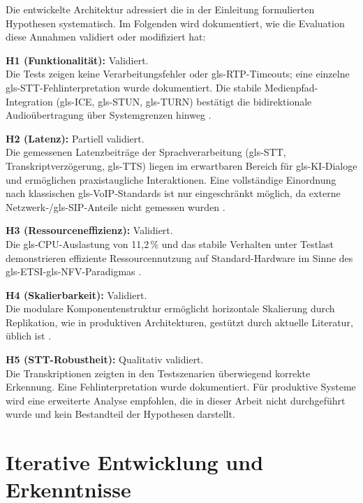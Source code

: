 Die entwickelte Architektur adressiert die in der Einleitung formulierten Hypothesen systematisch. Im Folgenden wird dokumentiert, wie die Evaluation diese Annahmen validiert oder modifiziert hat:

\textbf{H1 (Funktionalität):} Validiert.\\ Die Tests zeigen keine Verarbeitungsfehler oder \gls{gls-RTP}-Timeouts; eine einzelne \gls{gls-STT}-Fehlinterpretation wurde dokumentiert. Die stabile Medienpfad-Integration (\gls{gls-ICE}, \gls{gls-STUN}, \gls{gls-TURN}) bestätigt die bidirektionale Audioübertragung über Systemgrenzen hinweg \parencite{rfc5245,rfc5389,rfc5766,rfc3711}.

\textbf{H2 (Latenz):} Partiell validiert.\\ Die gemessenen Latenzbeiträge der Sprachverarbeitung (\gls{gls-STT}, Transkriptverzögerung, \gls{gls-TTS}) liegen im erwartbaren Bereich für \gls{gls-KI}‑Dialoge und ermöglichen praxistaugliche Interaktionen. Eine vollständige Einordnung nach klassischen \gls{gls-VoIP}‑Standards ist nur eingeschränkt möglich, da externe Netzwerk‑/\gls{gls-SIP}‑Anteile nicht gemessen wurden \parencite{ITU-T-G114}.

\textbf{H3 (Ressourceneffizienz):} Validiert.\\ Die \gls{gls-CPU}-Auslastung von 11,2\,\% und das stabile Verhalten unter Testlast demonstrieren effiziente Ressourcennutzung auf Standard-Hardware im Sinne des \gls{gls-ETSI}-\gls{gls-NFV}-Paradigmas \parencite{ETSI-NFV,ETSI-REL}.

\textbf{H4 (Skalierbarkeit):} Validiert.\\ Die modulare Komponentenstruktur ermöglicht horizontale Skalierung durch Replikation, wie in produktiven Architekturen, gestützt durch aktuelle Literatur, üblich ist \parencite{ETSI-REL,Antonova2025}.

\textbf{H5 (STT-Robustheit):} Qualitativ validiert.\\ Die Transkriptionen zeigten in den Testszenarien überwiegend korrekte Erkennung. Eine Fehlinterpretation wurde dokumentiert. Für produktive Systeme wird eine erweiterte Analyse empfohlen, die in dieser Arbeit nicht durchgeführt wurde und kein Bestandteil der Hypothesen darstellt.

\section{Iterative Entwicklung und Erkenntnisse}

